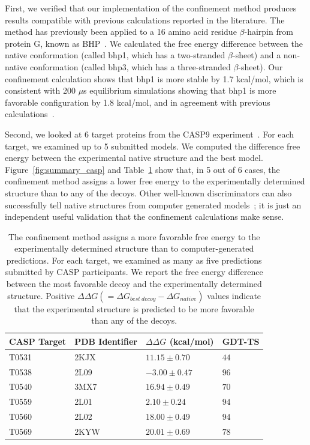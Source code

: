 \documentclass[12pt]{article}
\begin{document}
First, we verified that our implementation of the confinement method produces results compatible with previous
calculations reported in the literature.  The method has previously been applied to a 16 amino acid residue
$\beta$-hairpin from protein G, known as BHP~\cite{Cecchini2009}. We calculated the free energy difference between the
native conformation (called bhp1, which has a two-stranded $\beta$-sheet) and a non-native conformation (called bhp3,
which has a three-stranded $\beta$-sheet). Our confinement calculation shows that bhp1 is more stable by 1.7 kcal/mol,
which is consistent with 200 $\mu$s equilibrium simulations showing that bhp1 is more favorable configuration by 1.8
kcal/mol, and in agreement with previous calculations~\cite{Cecchini2009}.

Second, we looked at 6 target proteins from the CASP9 experiment~\cite{Moult2011}. For each target, we examined up to 5
submitted models.  We computed the difference free energy between the experimental native structure and the best model.
Figure~\ref{fig:summary_casp} and Table~\ref{table:casp_control} show that, in 5 out of 6 cases, the confinement method
assigns a lower free energy to the experimentally determined structure than to any of the decoys. Other well-known
discriminators can also successfully tell native structures from computer generated models~\cite{Sheffler2009,Zhou2002};
it is just an independent useful validation that the confinement calculations make sense.

\begin{table}
\begin{center}
\caption{The confinement method assigns a more favorable free energy to the experimentally determined structure than to
    computer-generated predictions. For each target, we examined as many as five predictions submitted by CASP
    participants. We report the free energy difference between the most favorable decoy and the experimentally
    determined structure. Positive $\Delta\Delta G (=\Delta G_{best~decoy} - \Delta G_{native})$ values indicate that
    the experimental structure is predicted to be more favorable than any of the decoys.}
\label{table:casp_control}
\begin{tabular}{l l l l}\hline
    CASP Target  & PDB Identifier & $\Delta \Delta G$ (kcal/mol) & GDT-TS \\ \hline
     T0531       &    2KJX        &          $11.15 \pm 0.70$    &  $44$ \\ \hline
     T0538       &    2L09        &          $-3.00 \pm 0.47$    &  $96$ \\ \hline
     T0540       &    3MX7        &          $16.94 \pm 0.49$    &  $70$ \\ \hline
     T0559       &    2L01        &          $2.10 \pm 0.24$     &  $94$ \\ \hline
     T0560       &    2L02        &          $18.00 \pm 0.49$    &  $94$ \\ \hline
     T0569       &    2KYW        &          $20.01 \pm 0.69$    &  $78$ \\ \hline
\end{tabular}
\end{center}
\end{table}
\end{document}
